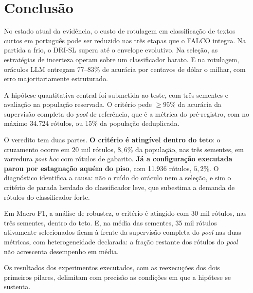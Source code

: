 \section{Conclusão}
\label{sec:conc-conclusao}

No estado atual da evidência, o custo de rotulagem em classificação de textos
curtos em português pode ser reduzido nas três etapas que o FALCO integra. Na
partida a frio, o DRI-SL supera até o envelope evolutivo. Na seleção, as
estratégias de incerteza operam sobre um classificador barato. E na
rotulagem, oráculos LLM entregam 77--83\% de acurácia por centavos de dólar o
milhar, com erro majoritariamente estruturado.

A hipótese quantitativa central foi submetida ao teste, com três sementes e
avaliação na população reservada. O critério pede $\ge 95\%$ da
acurácia da supervisão completa do \textit{pool} de referência, que é a
métrica do pré-registro, com no máximo 34.724 rótulos, ou $15\%$ da população
deduplicada.

O veredito tem duas partes. \textbf{O critério é atingível dentro do teto}:
o cruzamento ocorre em 20 mil rótulos, $8{,}6\%$ da população, nas três
sementes, em varredura \textit{post hoc} com rótulos de gabarito. \textbf{Já a
configuração executada parou por estagnação aquém do piso}, com 11.936
rótulos, $5{,}2\%$. O diagnóstico identifica a causa: não o
ruído do oráculo nem a seleção, e sim o critério de parada herdado do
classificador leve, que subestima a demanda de rótulos do classificador forte.

Em Macro F1, a análise de robustez, o critério é atingido com 30 mil rótulos,
nas três sementes, dentro do teto. E, na média das sementes, 35 mil rótulos
ativamente selecionados ficam à frente da supervisão completa do
\textit{pool} nas duas métricas, com heterogeneidade declarada: a fração
restante dos rótulos do \textit{pool} não acrescenta desempenho em média.

Os resultados dos experimentos executados, com as reexecuções dos dois
primeiros pilares, delimitam com precisão as condições em que a hipótese se
sustenta.

